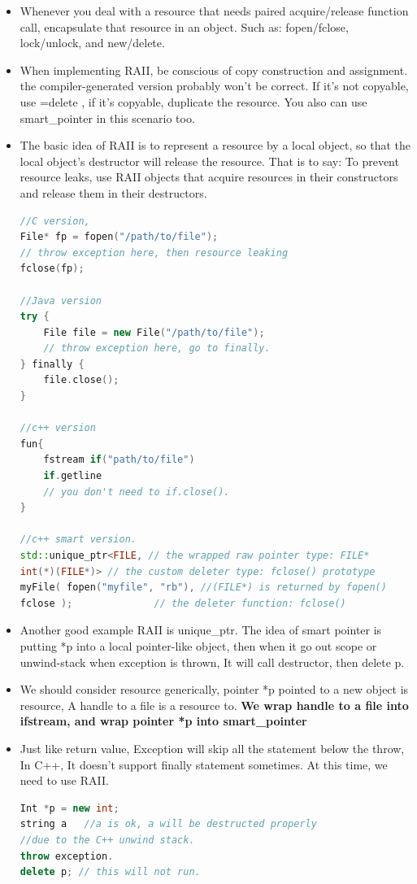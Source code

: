 \documentclass[a4paper,11pt,twoside]{book}
\begin{document}
\begin{itemize}
	\item Whenever you deal with a resource that needs paired acquire/release function call, encapsulate that resource in an object.  Such as: fopen/fclose, lock/unlock, and new/delete.
	
	\item When implementing RAII, be conscious of copy construction and assignment. the compiler-generated version probably won't be correct. If it's not copyable, use =delete , if it's copyable, duplicate the resource.  You also can use smart\_pointer in this scenario too.
	
	\item The basic idea of RAII  is to represent a resource by a local object, so that the local object's destructor will release the resource.  That is to say: To prevent resource leaks, use RAII objects that acquire resources in their constructors and release them in their destructors.
\begin{lstlisting}[frame=single, language=c++]
//C version,
File* fp = fopen("/path/to/file");
// throw exception here, then resource leaking
fclose(fp);
	
//Java version
try {
	File file = new File("/path/to/file");
	// throw exception here, go to finally.
} finally {
	file.close();
}
	
//c++ version
fun{
	fstream if("path/to/file")
	if.getline
	// you don't need to if.close().
}
	
//c++ smart version.
std::unique_ptr<FILE, // the wrapped raw pointer type: FILE*
int(*)(FILE*)> // the custom deleter type: fclose() prototype
myFile( fopen("myfile", "rb"), //(FILE*) is returned by fopen()
fclose );              // the deleter function: fclose()
\end{lstlisting}
	
	\item Another good example RAII is unique\_ptr. The idea of smart pointer is putting *p into a local pointer-like object, then when it go out scope or unwind-stack when exception is thrown, It will call destructor, then delete p.
	
	\item We should consider resource generically, pointer *p pointed to a new object is resource, A handle to a file is a resource to. \textbf{We wrap handle to a file into ifstream, and wrap pointer *p into smart\_pointer}
	
	\item Just like return value,  Exception will skip all the statement below the throw, In C++, It doesn't support finally statement sometimes. At this time, we need to use RAII.
\begin{lstlisting}[frame=single, language=c++]
Int *p = new int;
string a   //a is ok, a will be destructed properly
//due to the C++ unwind stack.
throw exception.
delete p; // this will not run.
\end{lstlisting}
	

\end{itemize}
\end{document}
